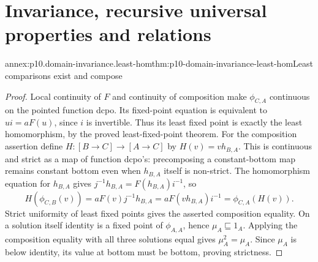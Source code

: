 \section{Invariance, recursive universal properties and relations}

\begin{annexitem}{annex:p10.domain-invariance.least-hom}{thm:p10-domain-invariance-least-hom}{Least comparisons exist and compose}
\begin{proof}
Local continuity of \(F\) and continuity of composition make
\(\phi_{C,A}\) continuous on the pointed function dcpo.
Its fixed-point equation is equivalent to \(ui=aF(u)\), since
\(i\) is invertible. Thus its least fixed point is exactly the
least homomorphism, by the proved least-fixed-point theorem.
For the composition assertion define
\(H:[B\longrightarrow C]\to[A\longrightarrow C]\) by
\(H(v)=vh_{B,A}\). This is continuous and strict as a map of
function dcpo's: precomposing a constant-bottom map remains
constant bottom even when \(h_{B,A}\) itself is non-strict.
The homomorphism equation for \(h_{B,A}\) gives
\(j^{-1}h_{B,A}=F(h_{B,A})i^{-1}\), so
\[
 H(\phi_{C,B}(v))=aF(v)j^{-1}h_{B,A}
     =aF(vh_{B,A})i^{-1}=\phi_{C,A}(H(v)).
\]
Strict uniformity of least fixed points gives the asserted
composition equality. On a solution itself identity is a fixed
point of \(\phi_{A,A}\), hence \(\mu_A\sqsubseteq1_A\).
Applying the composition equality with all three solutions equal
gives \(\mu_A^2=\mu_A\). Since \(\mu_A\) is below identity,
its value at bottom must be bottom, proving strictness.
\end{proof}
\end{annexitem}

